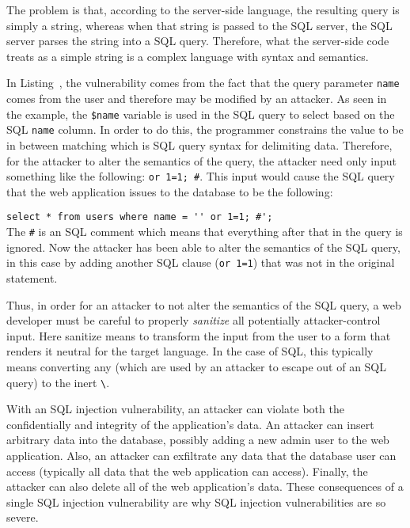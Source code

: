 The problem is that, according to the server-side language, the
resulting query is simply a string, whereas when that string is passed
to the SQL server, the SQL server parses the string into a SQL query.
Therefore, what the server-side code treats as a simple string is a
complex language with syntax and semantics. 

In Listing~, the vulnerability comes from the
fact that the query parameter \texttt{name} comes from the user and
therefore may be modified by an attacker. As seen in the example, the
\texttt{\$name} variable is used in the SQL query to select based on
the SQL \texttt{name} column. In order to do this, the programmer
constrains the value to be in between matching
\texttt{\textquotesingle} which is SQL query syntax for delimiting
data. Therefore, for the attacker to alter the semantics of the query,
the attacker need only input something like the following:
\texttt{\textquotesingle or 1=1; \#}. This input would cause the
SQL query that the web application issues to the database to be
the following:

\noindent\lstinline!select * from users where name = '' or 1=1; #';!
\\

The \texttt{\#} is an SQL comment which means that everything after
that in the query is ignored. Now the attacker has been able to alter
the semantics of the SQL query, in this case by adding another SQL
clause (\texttt{or 1=1}) that was not in the original statement.

Thus, in order for an attacker to not alter the semantics of the SQL
query, a web developer must be careful to properly \emph{sanitize} all
potentially attacker-control input. Here sanitize means to transform
the input from the user to a form that renders it neutral for the
target language. In the case of SQL, this typically means converting
any \texttt{\textquotesingle} (which are used by an attacker to escape
out of an SQL query) to the inert
\texttt{\textbackslash\textquotesingle}.

With an SQL injection vulnerability, an attacker can violate both the
confidentially and integrity of the application's data. An attacker
can insert arbitrary data into the database, possibly adding a new
admin user to the web application. Also, an attacker can exfiltrate
any data that the database user can access (typically all data that
the web application can access). Finally, the attacker can also delete
all of the web application's data. These consequences of a single SQL
injection vulnerability are why SQL injection vulnerabilities are so
severe.

